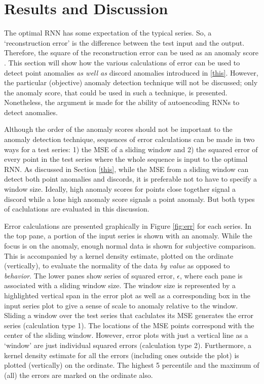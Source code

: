 \section{Results and Discussion}
\label{sec:results}

The optimal RNN has some expectation of the typical series.
%
So, a `reconstruction error' is the difference between the test input and the output.
%
Therefore, the square of the reconstruction error can be used as an anomaly score \cite{Erfani2014}.
%
This section will show how the various calculations of error can be used to detect point anomalies \emph{as well as} discord anomalies introduced in \ref{this}.
%
However, the particular (objective) anomaly detection technique will not be discussed;
only the anomaly score, that could be used in such a technique, is presented.
%
Nonetheless, the argument is made for the ability of autoencoding RNNs to detect anomalies.


Although the order of the anomaly scores should not be important to the anomaly detection technique, sequences of error calculations can be made in two ways for a test series: 1) the MSE of a sliding window and 2) the squared error of every point in the test series where the whole sequence is input to the optimal RNN.
%
As discussed in Section \ref{this}, while the MSE from a sliding window can detect both point anomalies and discords, it is preferable not to have to specify a window size.
%
Ideally, high anomaly scores for points close together signal a discord while a lone high anomaly score signals a point anomaly.
%
But both types of caclulations are evaluated in this discussion.


Error calculations are presented graphically in Figure \ref{fig:err} for each series.
%
In the top pane, a portion of the input series is shown with an anomaly.
%
While the focus is on the anomaly, enough normal data is shown for subjective comparison.
%
This is accompanied by a kernel density estimate, plotted on the ordinate (vertically), to evaluate the normality of the data \emph{by value} as opposed to \emph{behavior}.
%
The lower panes show series of squared error, $\epsilon$, where each pane is associated with a sliding window size.
%
The window size is represented by a highlighted vertical span in the error plot as well as a corresponding box in the input series plot to give a sense of scale to anomaly relative to the window.
%
Sliding a window over the test series that caclulates its MSE generates the error series (calculation type 1).
%
The locations of the MSE points correspond with the center of the sliding window.
%
However, error plots with just a vertical line as a `window' are just individual squared errors (calculation type 2).
%
Furthermore, a kernel density estimate for all the errors (including ones outside the plot) is plotted (vertically) on the ordinate.
%
The highest 5 percentile and the maximum of (all) the errors are marked on the ordinate also.


